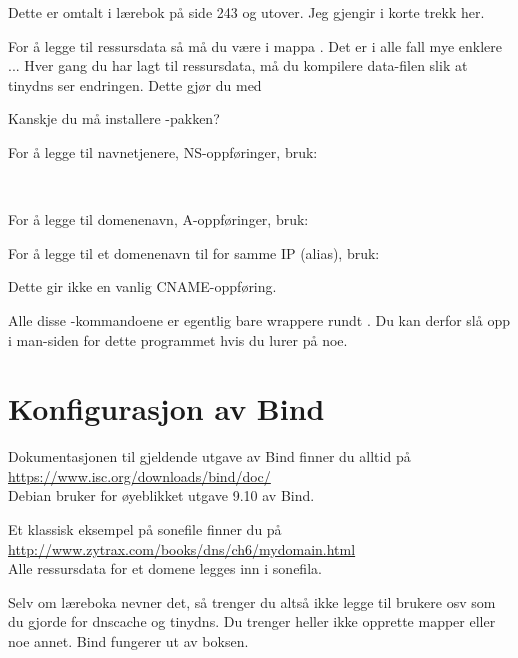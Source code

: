 
Dette er omtalt i lærebok på side 243 og utover. Jeg gjengir i korte trekk her.

For å legge til ressursdata så må du være i mappa .
Det er i alle fall mye enklere ... Hver gang du har lagt til ressursdata, 
må du kompilere data-filen slik at tinydns ser endringen. Dette gjør du med 


Kanskje du må installere -pakken?

For å legge til navnetjenere, NS-oppføringer, bruk:

\\

For å legge til domenenavn, A-oppføringer, bruk:


For å legge til et domenenavn til for samme IP (alias), bruk:


Dette gir ikke en vanlig CNAME-oppføring.

Alle disse -kommandoene er egentlig bare wrappere rundt
. Du kan derfor slå opp i man-siden for dette programmet
hvis du lurer på noe.

\section{Konfigurasjon av Bind}


Dokumentasjonen til gjeldende utgave av Bind finner du alltid på\\
\url{https://www.isc.org/downloads/bind/doc/} \cite{docs:bind}\\
Debian bruker for øyeblikket utgave 9.10 av Bind.

Et klassisk eksempel på sonefile finner du på\\
\url{http://www.zytrax.com/books/dns/ch6/mydomain.html}\\
Alle ressursdata for et domene legges inn i sonefila.

\begin{remark}
Selv om læreboka nevner det, så trenger du altså ikke legge til brukere osv 
som du gjorde for dnscache og tinydns. Du trenger heller ikke opprette mapper eller noe annet.
Bind fungerer ut av boksen.
\end{remark}

